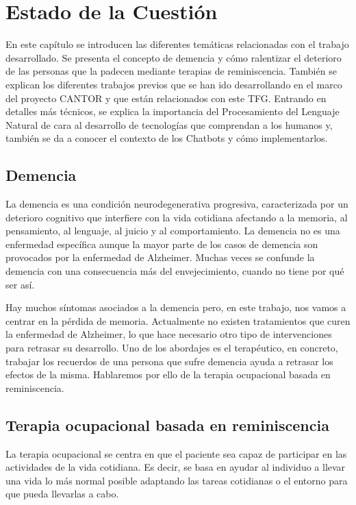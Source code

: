 \chapter{Estado de la Cuestión}
\label{cap:estadoDeLaCuestion}

En este capítulo se introducen las diferentes temáticas relacionadas con el trabajo desarrollado. Se presenta el concepto de demencia y cómo ralentizar el deterioro de las personas que la padecen mediante terapias de reminiscencia. También se explican los diferentes trabajos previos que se han ido desarrollando en el marco del proyecto CANTOR y que están relacionados con este TFG. Entrando en detalles más técnicos, se explica la importancia del Procesamiento del Lenguaje Natural de cara al desarrollo de tecnologías que comprendan a los humanos y, también se da a conocer el contexto de los Chatbots y cómo implementarlos.


\section{Demencia}
La demencia \citep{demencia} es una condición neurodegenerativa progresiva, caracterizada por un deterioro cognitivo que interfiere con la vida cotidiana afectando a la memoria, al pensamiento, al lenguaje, al juicio y al comportamiento. La demencia no es una enfermedad específica aunque la mayor parte de los casos de demencia son provocados por la enfermedad de Alzheimer. Muchas veces se confunde la demencia con una consecuencia más del envejecimiento, cuando no tiene por qué ser así.

Hay muchos síntomas asociados a la demencia pero, en este trabajo, nos vamos a centrar en la pérdida de memoria. Actualmente no existen tratamientos que curen la enfermedad de Alzheimer, lo que hace necesario otro tipo de intervenciones para retrasar su desarrollo. Uno de los abordajes es el terapéutico, en concreto, trabajar los recuerdos de una persona que sufre demencia ayuda a retrasar los efectos de la misma. Hablaremos por ello de la terapia ocupacional basada en reminiscencia.

\section{Terapia ocupacional basada en reminiscencia}
La terapia ocupacional \citep{terocup} se centra en que el paciente sea capaz de participar en las actividades de la vida cotidiana. Es decir, se basa en ayudar al individuo a llevar una vida lo más normal posible adaptando las tareas cotidianas o el entorno para que pueda llevarlas a cabo.

